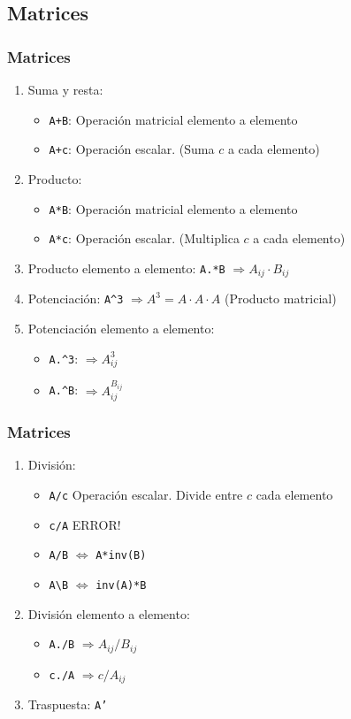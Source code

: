 \subsection{Matrices}
\begin{frame}[label=array_operaciones]
 \frametitle{Matrices}
 \begin{enumerate}
  \item Suma y resta:
    \begin{itemize}
     \item \texttt{A+B}: Operación matricial elemento a elemento
     \item \texttt{A+c}: Operación escalar. (Suma $c$ a cada elemento)
    \end{itemize}
  \item Producto:
    \begin{itemize}
     \item \texttt{A*B}: Operación matricial elemento a elemento
     \item \texttt{A*c}: Operación escalar. (Multiplica $c$ a cada elemento)
    \end{itemize}
  \item Producto \alert{elemento a elemento}: \texttt{A.*B} $\Rightarrow
    A_{ij}\cdot B_{ij}$
  \item Potenciación: \texttt{A\^{}3} $\Rightarrow A^3=A\cdot A\cdot A$
    (Producto matricial)
  \item Potenciación \alert{elemento a elemento}:
    \begin{itemize}
     \item \texttt{A.\^{}3}: $\Rightarrow A_{ij}^3$
     \item \texttt{A.\^{}B}: $\Rightarrow A_{ij}^{B_{ij}}$
    \end{itemize}
 \end{enumerate}
\end{frame}
\begin{frame}[label=array_operaciones2]
 \frametitle{Matrices}
 \begin{enumerate}
  \item División:
    \begin{itemize}
     \item \texttt{A/c} Operación escalar. Divide entre $c$ cada elemento
     \item \texttt{c/A} \alert{ERROR!}
     \item \texttt{A/B} $\Leftrightarrow$ \texttt{A*inv(B)}
     \item \texttt{A\textbackslash B} $\Leftrightarrow$ \texttt{inv(A)*B}
    \end{itemize}
  \item División elemento a elemento:
    \begin{itemize}
     \item \texttt{A./B} $\Rightarrow A_{ij}/B_{ij}$
     \item \texttt{c./A} $\Rightarrow c/A_{ij}$
    \end{itemize}
  \item Traspuesta: \texttt{A'}
 \end{enumerate}
\end{frame}
